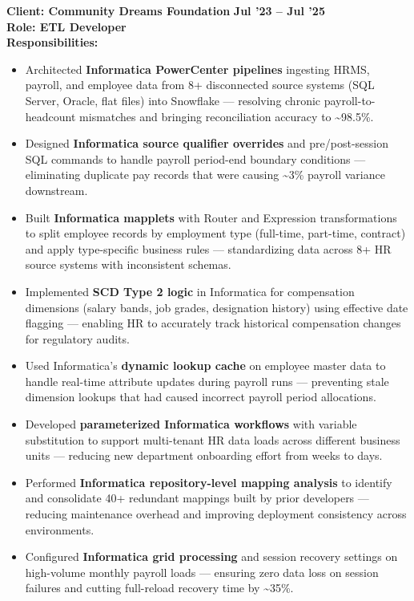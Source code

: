 \documentclass[a4paper,10pt]{article}
\begin{document}
\vspace{0.5cm}
\textbf{Client: Community Dreams Foundation} \hfill \textbf{Jul '23 – Jul '25} \\
\textbf{Role: ETL Developer} \\
\textbf{Responsibilities:}
\begin{itemize}
    \item Architected \textbf{Informatica PowerCenter pipelines} ingesting HRMS, payroll, and employee data from 8+ disconnected source systems (SQL Server, Oracle, flat files) into Snowflake — resolving chronic payroll-to-headcount mismatches and bringing reconciliation accuracy to \textasciitilde 98.5\%.
    \item Designed \textbf{Informatica source qualifier overrides} and pre/post-session SQL commands to handle payroll period-end boundary conditions — eliminating duplicate pay records that were causing \textasciitilde 3\% payroll variance downstream.
    \item Built \textbf{Informatica mapplets} with Router and Expression transformations to split employee records by employment type (full-time, part-time, contract) and apply type-specific business rules — standardizing data across 8+ HR source systems with inconsistent schemas.
    \item Implemented \textbf{SCD Type 2 logic} in Informatica for compensation dimensions (salary bands, job grades, designation history) using effective date flagging — enabling HR to accurately track historical compensation changes for regulatory audits.
    \item Used Informatica's \textbf{dynamic lookup cache} on employee master data to handle real-time attribute updates during payroll runs — preventing stale dimension lookups that had caused incorrect payroll period allocations.
    \item Developed \textbf{parameterized Informatica workflows} with variable substitution to support multi-tenant HR data loads across different business units — reducing new department onboarding effort from weeks to days.
    \item Performed \textbf{Informatica repository-level mapping analysis} to identify and consolidate 40+ redundant mappings built by prior developers — reducing maintenance overhead and improving deployment consistency across environments.
    \item Configured \textbf{Informatica grid processing} and session recovery settings on high-volume monthly payroll loads — ensuring zero data loss on session failures and cutting full-reload recovery time by \textasciitilde 35\%.

\end{itemize}
\end{document}
